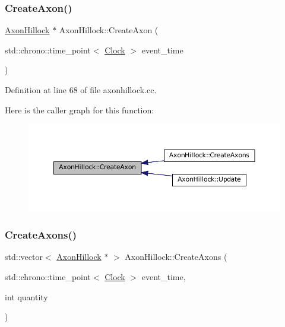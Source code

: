 \subsubsection{\texorpdfstring{Create\+Axon()}{CreateAxon()}}
{\footnotesize\ttfamily \mbox{\hyperlink{class_axon_hillock}{Axon\+Hillock}} $\ast$ Axon\+Hillock\+::\+Create\+Axon (\begin{DoxyParamCaption}\item[{std\+::chrono\+::time\+\_\+point$<$ \mbox{\hyperlink{universe_8h_a0ef8d951d1ca5ab3cfaf7ab4c7a6fd80}{Clock}} $>$}]{event\+\_\+time }\end{DoxyParamCaption})}



Definition at line 68 of file axonhillock.\+cc.

Here is the caller graph for this function\+:\nopagebreak
\begin{figure}[H]
\begin{center}
\leavevmode
\includegraphics[width=350pt]{class_axon_hillock_ae6b18ec6f2921b9d4461b89a9d72ab25_icgraph}
\end{center}
\end{figure}
\mbox{\label{class_axon_hillock_a15bf1a433f38b8b0c92e4a4efe22ec6f}} 
\subsubsection{\texorpdfstring{Create\+Axons()}{CreateAxons()}}
{\footnotesize\ttfamily std\+::vector$<$ \mbox{\hyperlink{class_axon_hillock}{Axon\+Hillock}} $\ast$ $>$ Axon\+Hillock\+::\+Create\+Axons (\begin{DoxyParamCaption}\item[{std\+::chrono\+::time\+\_\+point$<$ \mbox{\hyperlink{universe_8h_a0ef8d951d1ca5ab3cfaf7ab4c7a6fd80}{Clock}} $>$}]{event\+\_\+time,  }\item[{int}]{quantity }\end{DoxyParamCaption})}



